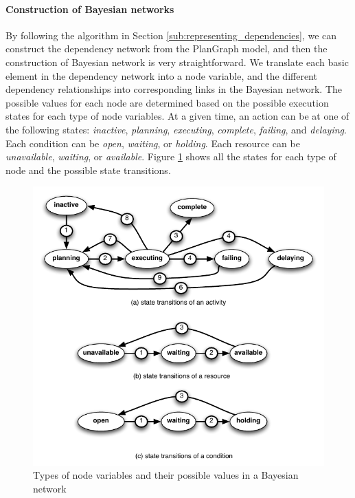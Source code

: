 \paragraph*{Construction of Bayesian networks} %
\label{par:construction_of_bayesian_networks}
By following the algorithm in Section \ref{sub:representing_dependencies}, we can construct the dependency network from the PlanGraph model, and then the construction of Bayesian network is very straightforward. We translate each basic element in the dependency network into a node variable, and the different dependency relationships into corresponding links in the Bayesian network. The possible values for each node are determined based on the possible execution states for each type of node variables. At a given time, an action can be at one of the following states: \emph{inactive}, \emph{planning}, \emph{executing}, \emph{complete}, \emph{failing}, and \emph{delaying}. Each condition can be \emph{open}, \emph{waiting}, or \emph{holding}. Each resource can be \emph{unavailable}, \emph{waiting}, or \emph{available}. Figure \ref{fig:state_transitions} shows all the states for each type of node and the possible state transitions.
\begin{figure}[htbp] %
	\centering
	\includegraphics{state_transitions.pdf} 
	\caption{Types of node variables and their possible values in a Bayesian network}
	\label{fig:state_transitions}
\end{figure}
